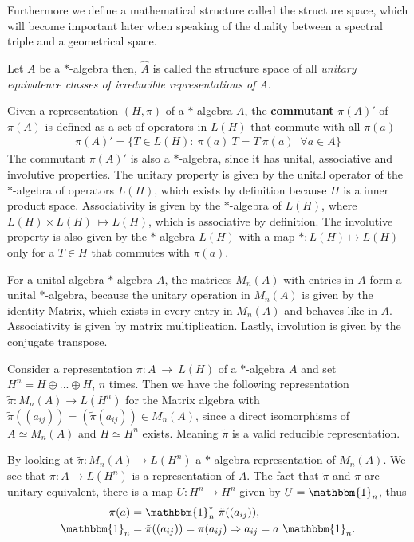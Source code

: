 Furthermore we define a mathematical structure called the structure space,
which will become important later when speaking of the duality between a
spectral triple and a geometrical space.
\begin{mydefinition}
    Let $A$ be a $*$-algebra then, $\hat{A}$ is called the structure space of all \textit{unitary equivalence classes
    of irreducible representations of A}.
\end{mydefinition}
    Given a representation $(H, \pi)$ of a $*$-algebra $A$, the \textbf{commutant} $\pi (A)'$ of $\pi (A)$ is defined as a set
    of operators in $L(H)$ that commute with all $\pi (a)$
    \begin{align}
        \pi (A)' = \big\{T \in L(H):\ \pi(a)\ T = T\ \pi(a) \;\; \forall a\in
        A\big\}
    \end{align}
    The commutant $\pi (A)'$ is also a $*$-algebra, since it has unital,
    associative and involutive properties.  The unitary property is given by
    the unital operator of the $*$-algebra of operators $L(H)$, which exists
    by definition because $H$ is a inner product space. Associativity is
    given by the $*$-algebra of $L(H)$, where $L(H) \times L(H)~\mapsto
    L(H)$, which is associative by definition. The involutive property is
    also given by the $*$-algebra $L(H)$ with a map $*: L(H) \mapsto L(H)$
    only for a $T \in H$ that commutes with $\pi (a)$.

    For a unital algebra $*$-algebra $A$, the matrices $M_n(A)$ with entries
    in $A$ form a unital $*$-algebra, because the unitary operation in
    $M_n(A)$ is given by the identity Matrix, which exists in every
    entry in $M_n(A)$ and behaves like in $A$. Associativity is given by
    matrix multiplication. Lastly, involution is given by the conjugate
    transpose.

    Consider a representation $\pi :A\ \rightarrow \ L(H)$ of a $*$-algebra
    $A$ and set $H^n = H \oplus ... \oplus H$, $n$ times. Then we have the following
    representation $\tilde{\pi}:M_n(A) \rightarrow L(H^n)$ for the Matrix
    algebra with $\tilde{\pi}((a_{ij})) = (\tilde{\pi}(a_{ij})) \in M_n(A)$,
    since a direct isomorphisms of $A \simeq M_n(A)$ and $H \simeq H^n$
    exists. Meaning $\tilde{\pi}$ is a valid reducible representation.

    By looking at $\tilde{\pi}:M_n(A) \rightarrow L(H^n)$ a $*$ algebra
    representation of $M_n(A)$. We see that $\pi: A \rightarrow L(H^n)$ is a representation of $A$.
    The fact that $\tilde{\pi}$ and $\pi$ are unitary equivalent, there is
    a map $U: H^n \rightarrow H^n$ given by $U=\mathbbm{1}_n$, thus
    \begin{align}
        \pi (a) &= \mathbbm{1}_n^*\ \tilde{\pi}((a_{ij})), \\
        \mathbbm{1}_n &= \tilde{\pi}((a_{ij})) = \pi (a_{ij})
    \Rightarrow a_{ij} = a\ \mathbbm{1}_n.
    \end{align}


